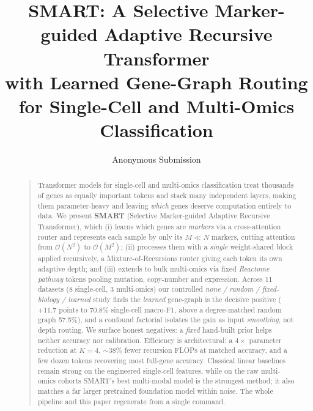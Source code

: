 \documentclass[letterpaper]{article}
\title{SMART: A Selective Marker-guided Adaptive Recursive Transformer\\ with Learned Gene-Graph Routing for Single-Cell and Multi-Omics Classification}
\author{Anonymous Submission}
\begin{document}
\maketitle

\begin{abstract}
\begin{quote}
Transformer models for single-cell and multi-omics classification treat thousands of
genes as equally important tokens and stack many independent layers, making them
parameter-heavy and leaving \emph{which} genes deserve computation entirely to data. We
present \textbf{SMART} (Selective Marker-guided Adaptive Recursive Transformer), which
(i) learns which genes are \emph{markers} via a cross-attention router and represents each
sample by only its $M\ll N$ markers, cutting attention from $\mathcal{O}(N^2)$ to
$\mathcal{O}(M^2)$; (ii) processes them with a \emph{single} weight-shared block applied
recursively, a Mixture-of-Recursions router giving each token its own adaptive depth; and
(iii) extends to bulk multi-omics via fixed \emph{Reactome pathway} tokens pooling
mutation, copy-number and expression. Across 11 datasets ($8$ single-cell,
$3$ multi-omics) our controlled \emph{none / random / fixed-biology / learned} study
finds the \emph{learned} gene-graph is the decisive positive ($+11.7$ points
to 70.8\% single-cell macro-F1, above a degree-matched random graph
57.5\%), and a confound factorial isolates the gain as input \emph{smoothing},
not depth routing. We surface honest negatives: a \emph{fixed} hand-built prior helps
neither accuracy nor calibration. Efficiency is architectural: a $4\times$
parameter reduction at $K{=}4$, $\sim$38\% fewer recursion FLOPs at
matched accuracy, and a few dozen tokens recovering most full-gene accuracy. Classical
linear baselines remain strong on the engineered single-cell features, while on the raw
multi-omics cohorts SMART's best multi-modal model is the strongest method; it also matches
a far larger pretrained foundation model within noise. The whole pipeline and this paper
regenerate from a single command.
\end{quote}
\end{abstract}
\end{document}
